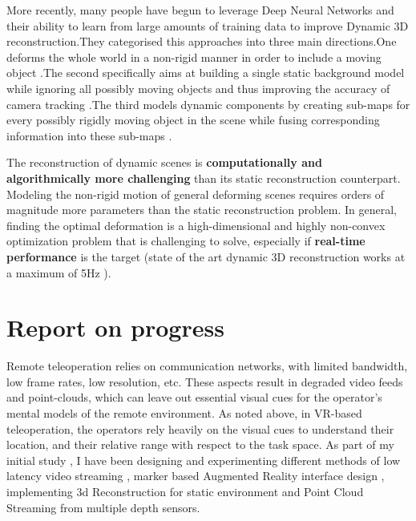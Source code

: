 More recently, many people have begun to leverage Deep Neural Networks and their ability to learn from large amounts of training data to improve Dynamic 3D reconstruction.They categorised this approaches into three main directions.One deforms the whole world in a non-rigid manner in order to include a moving object \cite{newcombe2015dynamicfusion}.The second specifically aims at building a single static background model while ignoring all possibly moving objects and thus improving the accuracy of camera tracking \cite{jaimez2017fast} \cite{scona2018staticfusion} \cite{barnes2018driven}\cite{bescos2018dynaslam}.The third models dynamic components by creating sub-maps for every possibly rigidly moving object in the scene while fusing corresponding information into these sub-maps \cite{runz2017co} \cite{barsan2018robust}\cite{runz2018maskfusion} \cite{xu2019mid} \cite{narita2019panopticfusion} \cite{ miksik2019live} \cite{strecke2019fusion} \cite{hachiuma2019detectfusion}.

The reconstruction of dynamic scenes is \textbf{computationally and algorithmically more challenging } than its static reconstruction counterpart. Modeling the non-rigid motion of general deforming scenes requires orders of magnitude more parameters than the static reconstruction problem. In general, finding the optimal deformation is a high-dimensional and highly non-convex optimization problem that is challenging to solve, especially if \textbf{real-time performance} is the target (state of the art dynamic 3D reconstruction works at a maximum of 5Hz \cite{inproceedings}).

\section{Report on progress}

Remote  teleoperation  relies  on  communication  networks,  with  limited  bandwidth,  low  frame  rates,  low  resolution,  etc.  These  aspects  result  in  degraded  video  feeds  and  point-clouds,  which  can  leave  out essential visual cues for the operator’s mental models of the remote environment. As noted above, in VR-based teleoperation, the operators rely heavily on the visual cues to understand their location, and their relative range with respect to the task space. 
As part of my initial study , I have been designing and experimenting different methods of low latency video streaming , marker based Augmented Reality interface design , implementing 3d Reconstruction for static environment and Point Cloud Streaming from multiple depth sensors.

